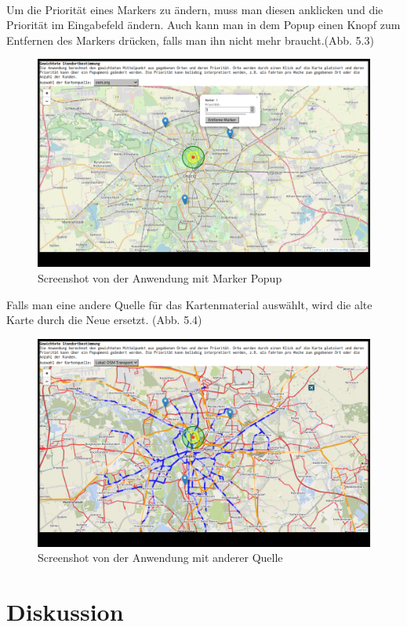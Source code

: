 \documentclass[a4paper, 12pt]{scrreprt}
\begin{document}
\\
Um die Priorität eines Markers zu ändern, muss man diesen anklicken und die Priorität im Eingabefeld ändern. Auch kann man in dem Popup einen Knopf zum Entfernen des Markers drücken, falls man ihn nicht mehr braucht.(Abb. 5.3)\\
\begin{figure}[h]
\includegraphics[width=\linewidth]{bell3_1.png}\caption{Screenshot von der Anwendung mit Marker Popup}
\end{figure}
Falls man eine andere Quelle für das Kartenmaterial auswählt, wird die alte Karte durch die Neue ersetzt. (Abb. 5.4)
\begin{figure}
\includegraphics[width=\linewidth]{bell4_1.png}
\caption{Screenshot von der Anwendung mit anderer Quelle}
\end{figure}
\chapter{Diskussion}
\end{document}
